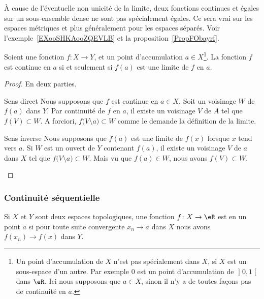 \begin{remark}
    À cause de l'éventuelle non unicité de la limite, deux fonctions continues et égales sur un sous-ensemble dense ne sont pas spécialement égales. Ce sera vrai sur les espaces métriques et plus généralement pour les espaces séparés. Voir l'exemple~\ref{EXooSHKAooZQEVLB} et la proposition~\ref{PropFObayrf}.
\end{remark}

\begin{lemma}
Soient une fonction \( f\colon X\to Y\), et un point d'accumulation \( a\in X\)\footnote{Un point d'accumulation de \( X\) n'est pas spécialement dans \( X\), si \( X\) est un sous-espace d'un autre. Par exemple \( 0\) est un point d'accumulation de \( \mathopen] 0 , 1 \mathclose[\) dans \( \eR\). Ici nous supposons que \( a\in X\), sinon il n'y a de toutes façons pas de continuité en \( a\).}. La fonction \( f\) est continue en \( a\) si et seulement si \( f(a)\) est une limite de \( f\) en \( a\).
\end{lemma}

\begin{proof}
    En deux parties.
    \begin{subproof}
        \item[Sens direct]
            Nous supposons que \( f\) est continue en \( a\in X\). Soit un voisinage \( W\) de \( f(a)\) dans \( Y\). Par continuité de \( f\) en \( a\), il existe un voisinage \( V\) de \( A\) tel que \( f(V)\subset W\). A forciori, \( f\big( V\setminus{{a}} \big)\subset W\) comme le demande la définition de la limite.
        \item[Sens inverse]
            Nous supposons que \( f(a)\) est une limite de \( f(x)\) lorsque \( x\) tend vers \( a\). Si \( W\) est un ouvert de \( Y\) contenant \( f(a)\), il existe un voisinage \( V\) de \( a\) dans \( X\) tel que \( f\big( V\setminus{{a}} \big)\subset W\). Mais vu que \( f(a)\in W\), nous avons \( f(V)\subset W\).
    \end{subproof}
\end{proof}

\subsubsection{Continuité séquentielle}

\begin{definition}  \label{DefENioICV}
    Si \( X\) et \( Y \) sont deux espaces topologiques, une fonction \( f\colon X\to \eR\) est  en un point \( a\) si pour toute suite convergente \( x_n\to a\) dans \( X\) nous avons \( f(x_n)\to f(x)\) dans \( Y\).
\end{definition}

